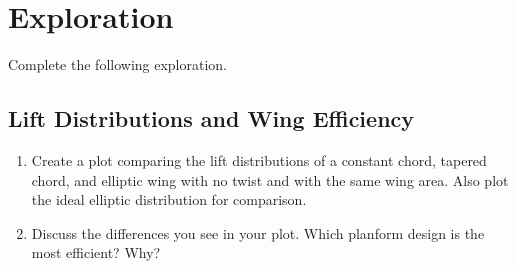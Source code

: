 \documentclass[11pt]{article}
\begin{document}
\section{Exploration}
\label{sec:exploration}

Complete the following exploration.

\subsection{Lift Distributions and Wing Efficiency}

\begin{enumerate}[label=\roman*.]
	\item Create a plot comparing the lift distributions of a constant chord, tapered chord, and elliptic wing with no twist and with the same wing area.  Also plot the ideal elliptic distribution for comparison.
	\item Discuss the differences you see in your plot.  Which planform design is the most efficient? Why?
\end{enumerate}
\end{document}
